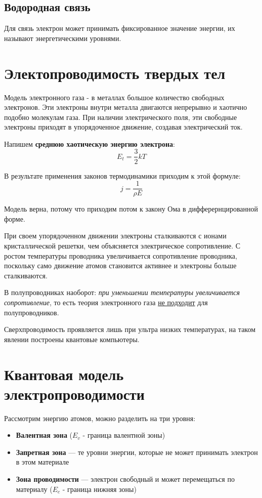 \documentclass[../main.tex]{subfiles}
\begin{document}
\subsection{Водородная связь}

Для связь электрон может принимать фиксированное значение энергии, их называют энергетическими уровнями.

\section{Электопроводимость твердых тел}
Модель электронного газа - в металлах большое количество свободных электронов. Эти электроны внутри металла двигаются непрерывно и хаотично подобно молекулам газа.
При наличии электрического поля, эти свободные электроны приходят в упорядоченное движение, создавая электрический ток.

Напишем \textbf{среднюю хаотическую энергию электрона}:
\[E_t = \frac{3}{2} kT\]

В результате применения законов термодинамики приходим к этой формуле:
\[j = \frac{1}{\rho E}\]

Модель верна, потому что приходим потом к закону Ома в дифферернцированной форме.

При своем упорядоченном движении электроны сталкиваются с ионами кристаллической решетки, чем объясняется электрическое сопротивление. С ростом
температуры проводника увеличивается сопротивление проводника, поскольку само движение атомов становится активнее и электроны больше сталкиваются.

В полупроводниках наоборот: \textit{при уменьшении температуры увеличивается сопротивление}, то есть теория электронного газа \underline{не подходит} для полупроводников.

Сверхпроводимость  проявляется лишь при ультра низких температурах, на таком явлении построены квантовые компьютеры.

\section{Квантовая модель электропроводимости}
Рассмотрим энергию атомов, можно разделить на три уровня:
\begin{itemize}
    \item \textbf{Валентная зона} ($E_v$ - граница валентной зоны)
    \item \textbf{Запретная зона} --- те уровни энергии, которые не может принимать электрон в этом материале
    \item \textbf{Зона проводимости} --- электрон свободный и может перемещаться по материалу ($E_c$ - граница нижняя зоны)
\end{itemize}
\end{document}
